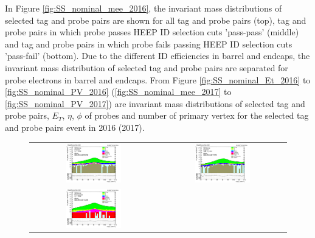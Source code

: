In Figure \ref{fig:SS_nominal_mee_2016}, the invariant mass distributions of selected tag and probe pairs are shown for all tag and probe pairs (top), tag and probe pairs in which probe passes HEEP ID selection cuts 'pass-pass' (middle) and tag and probe pairs in which probe fails passing  HEEP ID selection cuts 'pass-fail' (bottom). Due to the different ID efficiencies in barrel and endcaps, the invariant mass distribution of selected tag and probe pairs are separated for probe electrons in barrel and endcaps.
From Figure \ref{fig:SS_nominal_Et_2016} to \ref{fig:SS_nominal_PV_2016} (\ref{fig:SS_nominal_mee_2017} to \ref{fig:SS_nominal_PV_2017}) are invariant mass distributions of selected tag and probe pairs, $E_{T}$, $\eta$, $\phi$ of probes and number of primary vertex for the selected tag and probe pairs event in 2016 (2017).
\begin{figure}[htp]
  \begin{center}
    \begin{tabular}{cc}
      \includegraphics[width=0.45\textwidth]{figures/Zprime/2016/ScaleFactor/SameSign/nominal/stack_mee_Barrel_probes_PUW.png} &
      \includegraphics[width=0.45\textwidth]{figures/Zprime/2016/ScaleFactor/SameSign/nominal/stack_mee_Endcap_probes_PUW.png} \\
      \includegraphics[width=0.45\textwidth]{figures/Zprime/2016/ScaleFactor/SameSign/nominal/stack_mee_Barrel_pass_PUW.png} &

\end{tabular}
\end{center}
\end{figure}
